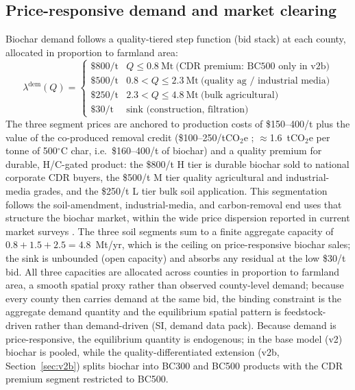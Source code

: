 \subsection{Price-responsive demand and market clearing}

Biochar demand follows a quality-tiered step function (bid stack) at each
county, allocated in proportion to farmland area:
\begin{equation}
\lambda^{\mathrm{dem}}(Q)=\begin{cases}
\$800/\mathrm{t} & Q\le 0.8~\mathrm{Mt}\ \text{(CDR premium: BC500 only in v2b)}\\
\$500/\mathrm{t} & 0.8<Q\le 2.3~\mathrm{Mt}\ \text{(quality ag / industrial media)}\\
\$250/\mathrm{t} & 2.3<Q\le 4.8~\mathrm{Mt}\ \text{(bulk agricultural)}\\
\$30/\mathrm{t}  & \text{sink (construction, filtration)}
\end{cases}
\end{equation}
The three segment prices are anchored to production costs of \$150--400/t
\cite{roberts2010,shabangu2014} plus the value of the co-produced removal
credit (\$100--250/tCO$_2$e \cite{cdrfyi2024,verraVM0044}; $\approx$1.6~tCO$_2$e
per tonne of 500$^\circ$C char, i.e.\ \$160--400/t of biochar) and a quality
premium for durable, H/C-gated product: the \$800/t H tier is durable biochar
sold to national corporate CDR buyers, the \$500/t M tier quality agricultural
and industrial-media grades, and the \$250/t L tier bulk soil application.
This segmentation follows the soil-amendment, industrial-media, and
carbon-removal end uses that structure the biochar market, within the wide
price dispersion reported in current market surveys \cite{ibi2025}. The three soil
segments sum to a finite aggregate capacity of $0.8+1.5+2.5 = 4.8$~Mt/yr,
which is the ceiling on price-responsive biochar sales; the sink is unbounded
(open capacity) and absorbs any residual at the low \$30/t bid. All three
capacities are allocated across counties in proportion to farmland area, a
smooth spatial proxy rather than observed county-level demand; because every
county then carries demand at the same bid, the binding constraint is the
aggregate demand quantity and the equilibrium spatial pattern is
feedstock-driven rather than demand-driven (SI, demand data pack).
Because demand is
price-responsive, the equilibrium quantity is endogenous; in the base model
(v2) biochar is pooled, while the quality-differentiated extension (v2b,
Section~\ref{sec:v2b}) splits biochar into BC300 and BC500 products with the
CDR premium segment restricted to BC500.

